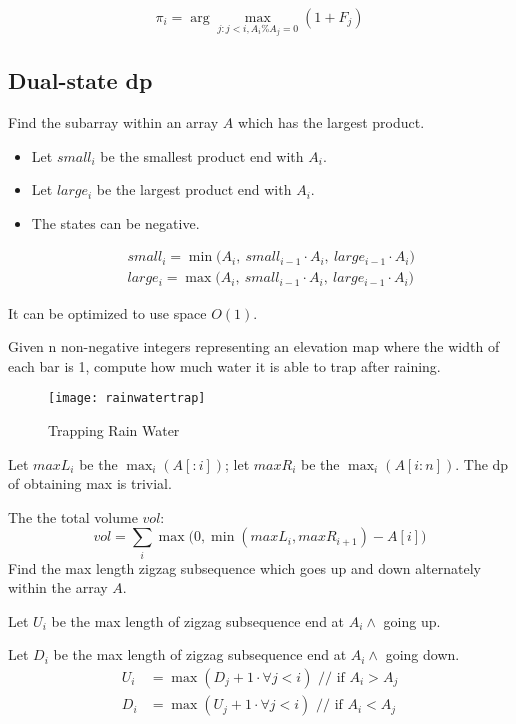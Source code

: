 $$
\pi_i = \arg\max_{j: j< i, A_i\%A_j=0}(1+F_j)
$$

\subsection{Dual-state dp}
 Find the subarray within an array $A$ which has the largest product. 
\begin{itemize}
\item Let $small_i$ be the smallest product end with $A_i$. 
\item Let $large_i$ be the largest product end with $A_i$.
\item The states can be negative. 
\end{itemize}
\begin{eqnarray*}
&& small_i = \min\Big( A_i,\ small_{i-1}\cdot A_i,\ large_{i-1}\cdot A_i \Big)
\nonumber \\
&& large_i = \max\Big( A_i,\ small_{i-1}\cdot A_i,\ large_{i-1}\cdot A_i \Big)
\end{eqnarray*}

It can be optimized to use space $O(1)$. 

Given n non-negative integers representing an elevation map where the width of each
bar is 1, compute how much water it is able to trap after raining.
\begin{figure}[]
    \centerline{\texttt{[image: rainwatertrap]}}
    \caption{Trapping Rain Water}
  \label{fig:rainwatertrap}
\end{figure}

Let $maxL_i$ be the $\max_{i}(A[:i])$; let $maxR_i$ be the $\max_{i}(A[i:n])$. The dp of obtaining max is trivial. 

The the total volume $vol$:
$$
vol = \sum_i\max\big(0,\min(maxL_i, maxR_{i+1})-A[i]\big)
$$
 Find the max length zigzag subsequence which goes up and down alternately within the array $A$.

Let $U_i$ be the max length of zigzag subsequence end at $A_i \wedge$ going up.

Let $D_i$ be the max length of zigzag subsequence end at $A_i \wedge$ going down.
\begin{align*}
U_i &= \max(D_j+1 \cdot \forall j < i) \text{ // if $A_i > A_j$} \\ 
D_i &= \max(U_j+1 \cdot \forall j < i) \text{ // if $A_i < A_j$} 
\end{align*}

